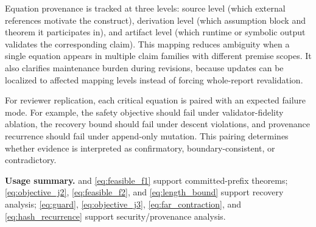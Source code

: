 \documentclass{article} %
\begin{document}
Equation provenance is tracked at three levels: source level (which external references motivate the construct), derivation level (which assumption block and theorem it participates in), and artifact level (which runtime or symbolic output validates the corresponding claim). This mapping reduces ambiguity when a single equation appears in multiple claim families with different premise scopes. It also clarifies maintenance burden during revisions, because updates can be localized to affected mapping levels instead of forcing whole-report revalidation.

For reviewer replication, each critical equation is paired with an expected failure mode. For example, the safety objective should fail under validator-fidelity ablation, the recovery bound should fail under descent violations, and provenance recurrence should fail under append-only mutation. This pairing determines whether evidence is interpreted as confirmatory, boundary-consistent, or contradictory.

\textbf{Usage summary.}  and \eqref{eq:feasible_f1} support committed-prefix theorems; \eqref{eq:objective_j2}, \eqref{eq:feasible_f2}, and \eqref{eq:length_bound} support recovery analysis; \eqref{eq:guard}, \eqref{eq:objective_j3}, \eqref{eq:far_contraction}, and \eqref{eq:hash_recurrence} support security/provenance analysis.
\end{document}
